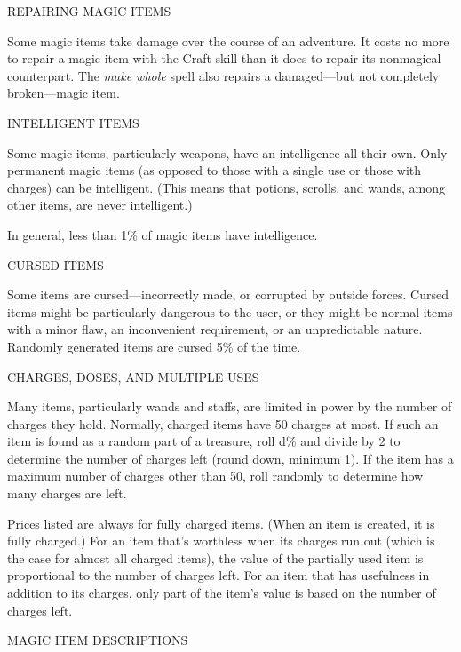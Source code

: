 \documentclass{article}
\begin{document}
\vspace{12pt}
{\large{}REPAIRING MAGIC ITEMS}

Some magic items take damage over the course of an adventure. It costs no more 
to repair a magic item with the Craft skill than it does to repair its nonmagical 
counterpart. The \textit{make whole }spell also repairs a damaged---but not completely 
broken---magic item.

\vspace{12pt}
{\large{}INTELLIGENT ITEMS}

Some magic items, particularly weapons, have an intelligence all their own. Only 
permanent magic items (as opposed to those with a single use or those with charges) 
can be intelligent. (This means that potions, scrolls, and wands, among other items, 
are never intelligent.)

In general, less than 1\% of magic items have intelligence. 

\vspace{12pt}
{\large{}CURSED ITEMS}

Some items are cursed---incorrectly made, or corrupted by outside forces. Cursed 
items might be particularly dangerous to the user, or they might be normal items 
with a minor flaw, an inconvenient requirement, or an unpredictable nature. Randomly 
generated items are cursed 5\% of the time. 

\vspace{12pt}
{\large{}CHARGES, DOSES, AND MULTIPLE USES}

Many items, particularly wands and staffs, are limited in power by the number of 
charges they hold. Normally, charged items have 50 charges at most. If such an 
item is found as a random part of a treasure, roll d\% and divide by 2 to determine 
the number of charges left (round down, minimum 1). If the item has a maximum number 
of charges other than 50, roll randomly to determine how many charges are left. 

Prices listed are always for fully charged items. (When an item is created, it 
is fully charged.) For an item that's worthless when its charges run out (which 
is the case for almost all charged items), the value of the partially used item 
is proportional to the number of charges left. For an item that has usefulness 
in addition to its charges, only part of the item's value is based on the number 
of charges left.

\vspace{12pt}
{\huge{}MAGIC ITEM DESCRIPTIONS}
\end{document}

